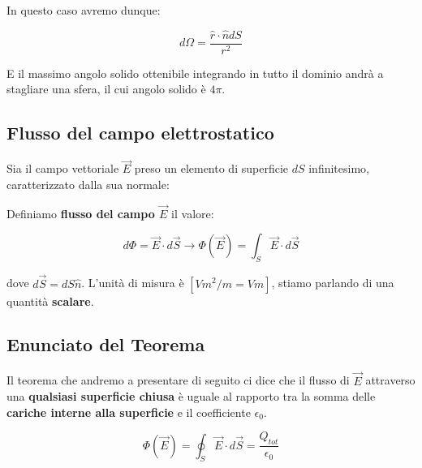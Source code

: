 In questo caso avremo dunque: 

\begin{equation}
	d\Omega = \frac{\hat{r} \cdot \hat{n} dS}{r^2}
\end{equation}

E il massimo angolo solido ottenibile integrando in tutto il dominio andrà a stagliare una sfera, il cui angolo solido è $4\pi$. 

\subsection{Flusso del campo elettrostatico}
Sia il campo vettoriale $\vec{E}$ preso un elemento di superficie $dS$ infinitesimo, caratterizzato dalla sua normale: 

\begin{figure}[ht]
	\centering
\end{figure}

Definiamo \textbf{flusso del campo $\vec{E}$} il valore: 

\begin{large}
	\begin{equation} \label{eq_flusso}
		d\Phi = \vec{E} \cdot d\vec{S} \rightarrow \Phi(\vec{E}) = \int_{S} \vec{E} \cdot d\vec{S} 
	\end{equation}
\end{large}

dove $d\vec{S} = dS\hat{n}$. L'unità di misura è $\left[ Vm^2/m =  Vm\right]$, stiamo parlando di una quantità \textbf{scalare}. 

\subsection{Enunciato del Teorema}
Il teorema che andremo a presentare di seguito ci dice che il flusso di $\vec{E}$ attraverso una \textbf{qualsiasi superficie chiusa} è uguale al rapporto tra la somma delle \textbf{cariche interne alla superficie} e il coefficiente $\epsilon_0$. 

\begin{tcolorbox}[colframe=red, colback=red!10, title=Teorema di Gauss]
	\begin{large}
		\begin{equation}
			\Phi (\vec{E}) = \oint_S{\vec{E} \cdot d\vec{S}} = \frac{Q_{tot}}{\epsilon_0}
		\end{equation}
	\end{large}
\end{tcolorbox}
 
